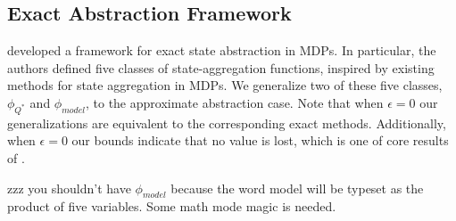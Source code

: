 \subsection{Exact Abstraction Framework}

\citep*{li2006towards} developed a framework for exact state abstraction in \acp{MDP}. In particular, the authors defined five classes of state-aggregation functions, inspired by existing methods for state aggregation in \acp{MDP}. We generalize two of these five classes, $\phi_{Q^*}$ and $\phi_{model}$, to the approximate abstraction case. Note that when $\epsilon=0$ our generalizations are equivalent to the corresponding exact methods. Additionally, when $\epsilon=0$ our bounds indicate that no value is lost, which is one of core results of \citep{li2006towards}.

zzz you shouldn't have $\phi_{model}$ because the word model will be typeset as the product of five variables. Some math mode magic is needed.
